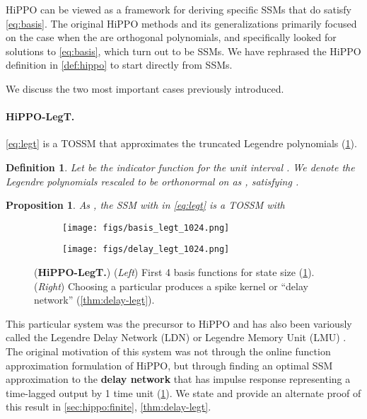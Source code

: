 \documentclass{article}
\newtheorem{proposition}[theorem]{Proposition}
\newtheorem{definition}{Definition}
\newcommand{\para}[1]{\paragraph{#1}}
\begin{document}
HiPPO can be viewed as a framework for deriving specific SSMs that do satisfy \eqref{eq:basis}.
The original HiPPO methods and its generalizations \citep{gu2020hippo,gu2021lssl} primarily focused on the case when the  are orthogonal polynomials,
and specifically looked for solutions to \eqref{eq:basis}, which turn out to be SSMs.
We have rephrased the HiPPO definition in \cref{def:hippo} to start directly from SSMs.

We discuss the two most important cases previously introduced.

\para{HiPPO-LegT.}
\eqref{eq:legt} is a TOSSM that approximates the truncated Legendre polynomials (\cref{fig:legt}).

\begin{definition}
  Let  be the indicator function for the unit interval .
  We denote the Legendre polynomials rescaled to be orthonormal on  as , satisfying .
\end{definition}

\begin{proposition}\label{prop:legt}
  As , the SSM with  in \eqref{eq:legt} is a TOSSM with
  
\end{proposition}

\begin{figure}[!t]
\begin{subfigure}{.5\linewidth}\centering
  \texttt{[image: figs/basis\_legt\_1024.png]}
\end{subfigure}
\begin{subfigure}{.5\linewidth}\centering
  \texttt{[image: figs/delay\_legt\_1024.png]}
\end{subfigure}
\caption{
  (\textbf{HiPPO-LegT.})
  (\emph{Left}) First 4 basis functions  for state size  (\cref{prop:legt}).
  (\emph{Right}) Choosing a particular  produces a spike kernel or ``delay network'' (\cref{thm:delay-legt}).
}
\label{fig:legt}
\end{figure}

This particular system was the precursor to HiPPO and has also been variously called the Legendre Delay Network (LDN) or Legendre Memory Unit (LMU) \citep{voelker2019dynamical,voelker2019legendre}.
The original motivation of this system was not through the online function approximation formulation of HiPPO, but through finding an optimal SSM approximation to the \textbf{delay network} that has impulse response  representing a time-lagged output by 1 time unit (\cref{fig:legt}).
We state and provide an alternate proof of this result in \cref{sec:hippo:finite}, \cref{thm:delay-legt}.
\end{document}
